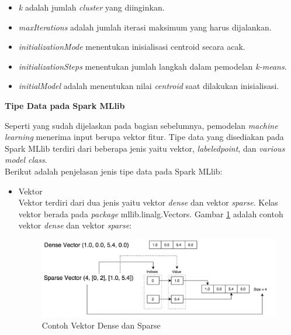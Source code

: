 \documentclass[a4paper,twoside]{article}
\begin{document}
\begin{enumerate}
\begin{enumerate}
\begin{itemize}
\item \textit{k} adalah jumlah \textit{cluster} yang diinginkan. 
\item \textit{maxIterations} adalah jumlah iterasi maksimum yang harus dijalankan.
\item \textit{initializationMode} menentukan inisialisasi centroid secara acak.
\item \textit{initializationSteps} menentukan jumlah langkah dalam pemodelan \textit{k-means}.
\item \textit{initialModel} adalah menentukan nilai \textit{centroid} saat dilakukan inisialisasi.
\end{itemize}

\end{enumerate}

\textbf{Tipe Data pada Spark MLlib}

Seperti yang sudah dijelaskan pada bagian sebelumnya, pemodelan \textit{machine learning} menerima input berupa vektor fitur. Tipe data yang disediakan pada Spark MLlib terdiri dari beberapa jenis yaitu vektor, \textit{labeledpoint}, dan \textit{various model class}. \\

\noindent Berikut adalah penjelasan jenis tipe data pada Spark MLlib:

\begin{itemize}
\item Vektor\\
Vektor terdiri dari dua jenis yaitu vektor \textit{dense} dan vektor \textit{sparse}. Kelas vektor berada pada \textit{package} mllib.linalg.Vectors. Gambar \ref{fig:vektor} adalah contoh vektor \textit{dense} dan vektor \textit{sparse}:

\begin{figure}[H]
	\centering
	\includegraphics[scale=0.5]{vektor}
	\caption{Contoh Vektor Dense dan Sparse}
	\label{fig:vektor}
\end{figure}

\begin{itemize}


\end{itemize}
\end{itemize}
\end{enumerate}
\end{document}
